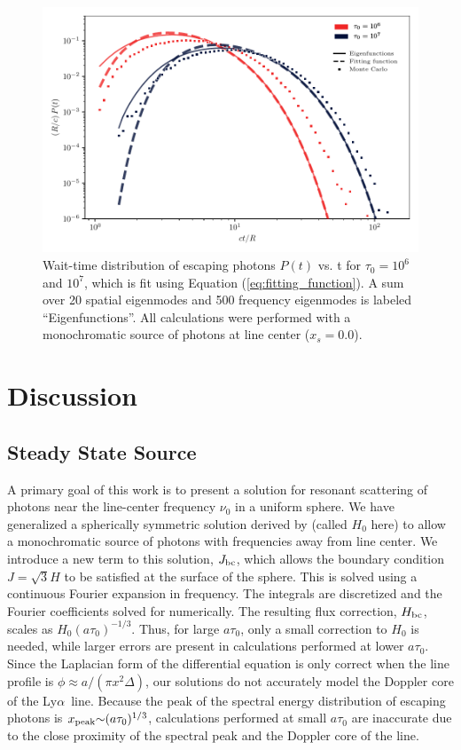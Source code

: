 \documentclass[linenumbers]{aastex63}
\newcommand\lya{Ly$\alpha$\ }
\begin{document}
\begin{figure}
    \centering
    \includegraphics{waittime.pdf}
    \caption{Wait-time distribution of escaping photons $P(t)$ vs. t  for $\tau_0=10^6$ and $10^7$, which is fit using Equation (\ref{eq:fitting_function}). A sum over 20 spatial eigenmodes and 500 frequency eigenmodes is labeled ``Eigenfunctions''. All calculations were performed with a monochromatic source of photons at line center ($x_s = 0.0$).}
    \label{fig:escape_time}
\end{figure}

\section{Discussion}

\subsection{Steady State Source}
A primary goal of this work is to present a solution for resonant scattering of photons near the line-center frequency $\nu_0$ in a uniform sphere. We have generalized a spherically symmetric solution derived by \citet{2006ApJ...649...14D} (called $H_0$ here) to allow a monochromatic source of photons with frequencies away from line center. We introduce a new term to this solution, $J_{\rm bc}$, which allows the boundary condition $J=\sqrt{3}H$ to be satisfied at the surface of the sphere. This is solved using a continuous Fourier expansion in frequency. The integrals are discretized and the Fourier coefficients solved for numerically. The resulting flux correction, $H_{\rm bc}$, scales as $H_0(a\tau_0)^{-1/3}$. Thus, for large $a\tau_0$, only a small correction to $H_0$ is needed, while larger errors are present in calculations performed at lower $a\tau_0$. Since the Laplacian form of the differential equation is only correct when the line profile is $\phi \approx a/(\pi x^2 \Delta)$, our solutions do not accurately model the Doppler core of the \lya line. Because the peak of the spectral energy distribution of escaping photons is $x_{\rm peak} {\sim} (a\tau_0)^{1/3}$, calculations performed at small $a\tau_0$ are inaccurate due to the close proximity of the spectral peak and the Doppler core of the line.
\end{document}
